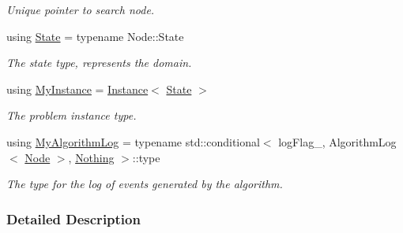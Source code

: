 \begin{DoxyCompactItemize}
\begin{DoxyCompactList}\small\item\em Unique pointer to search node. \end{DoxyCompactList}\item 
using \hyperlink{structslb_1_1ext_1_1algorithm_1_1BaseTraits_a83eb602d114a921553e8af5db8686ff0}{State} = typename Node\+::\+State\hypertarget{structslb_1_1ext_1_1algorithm_1_1BaseTraits_a83eb602d114a921553e8af5db8686ff0}{}\label{structslb_1_1ext_1_1algorithm_1_1BaseTraits_a83eb602d114a921553e8af5db8686ff0}

\begin{DoxyCompactList}\small\item\em The state type, represents the domain. \end{DoxyCompactList}\item 
using \hyperlink{structslb_1_1ext_1_1algorithm_1_1BaseTraits_a07651b3090a6858cb8bc67afce49c396}{My\+Instance} = \hyperlink{structslb_1_1core_1_1sb_1_1Instance}{Instance}$<$ \hyperlink{structslb_1_1ext_1_1algorithm_1_1BaseTraits_a83eb602d114a921553e8af5db8686ff0}{State} $>$\hypertarget{structslb_1_1ext_1_1algorithm_1_1BaseTraits_a07651b3090a6858cb8bc67afce49c396}{}\label{structslb_1_1ext_1_1algorithm_1_1BaseTraits_a07651b3090a6858cb8bc67afce49c396}

\begin{DoxyCompactList}\small\item\em The problem instance type. \end{DoxyCompactList}\item 
using \hyperlink{structslb_1_1ext_1_1algorithm_1_1BaseTraits_af1ee6f3b936602b3d81b4258c43206bd}{My\+Algorithm\+Log} = typename std\+::conditional$<$ log\+Flag\+\_\+, Algorithm\+Log$<$ \hyperlink{structslb_1_1ext_1_1algorithm_1_1BaseTraits_a4413b287fe7e24a87b1b6bc1bbf5c381}{Node} $>$, \hyperlink{structslb_1_1Nothing}{Nothing} $>$\+::type\hypertarget{structslb_1_1ext_1_1algorithm_1_1BaseTraits_af1ee6f3b936602b3d81b4258c43206bd}{}\label{structslb_1_1ext_1_1algorithm_1_1BaseTraits_af1ee6f3b936602b3d81b4258c43206bd}

\begin{DoxyCompactList}\small\item\em The type for the log of events generated by the algorithm. \end{DoxyCompactList}\end{DoxyCompactItemize}


\subsubsection{Detailed Description}
